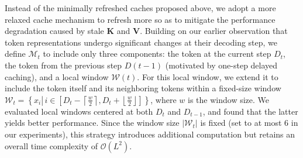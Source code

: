 \documentclass{article}
\newcommand{\bk}{\mathbf{K}}
\newcommand{\bv}{\mathbf{V}}
\begin{document}
Instead of the minimally refreshed caches proposed above, we adopt a more relaxed cache mechanism to refresh more so as to mitigate the performance degradation caused by stale $\bk$ and $\bv$. Building on our earlier observation that token representations undergo significant changes at their decoding step, we define $\mathcal{M}_t$ to include only three components: the token at the current step $D_t$, the token from the previous step $D(t-1)$ (motivated by one-step delayed caching), and a local window $\mathcal{W}(t)$. For this local window, we extend it to include the token itself and its neighboring tokens within a fixed-size window $\mathcal{W}_t=\left\{x_i \left\lvert\, i \in\left[ D_t-\left\lceil\frac{w}{2}\right\rceil, D_t+\left\lfloor\frac{w}{2}\right\rfloor\right]\right.\right\}$, where $w$ is the window size. We evaluated local windows centered at both $D_t$ and $D_{t-1}$, and found that the latter yields better performance. Since the window size $|\mathcal{W}_t|$ is fixed (set to at most 6 in our experiments), this strategy introduces additional computation but retains an overall time complexity of $\mathcal{O}(L^2)$.
\end{document}
